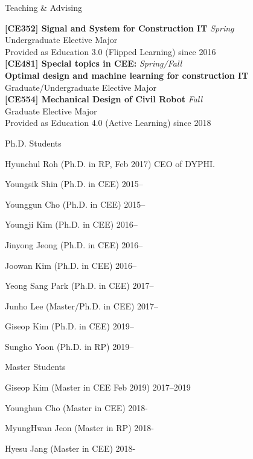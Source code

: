 \begin{rSection}{Teaching \& Advising}

{\bf[CE352] Signal and System for Construction IT} \hfill {\em Spring} \\
Undergraduate Elective Major \\
Provided as Education 3.0 (Flipped Learning) since 2016\\

{\bf[CE481] Special topics in CEE:} \hfill {\em Spring/Fall} \\
{\bf Optimal design and machine learning for construction IT}\\
Graduate/Undergraduate Elective Major \\

{\bf[CE554] Mechanical Design of Civil Robot } \hfill {\em Fall} \\
Graduate Elective Major \\
Provided as Education 4.0 (Active Learning) since 2018\\

\begin{rSubsection}{Ph.D. Students}{}{}{}
  \item Hyunchul Roh (Ph.D. in \acf{RP}, Feb 2017) \hfill CEO of DYPHI.
  \item Youngsik Shin (Ph.D. in \acf{CEE}) \hfill 2015--
  \item Younggun Cho (Ph.D. in \ac{CEE}) \hfill 2015--
  \item Youngji Kim (Ph.D. in \ac{CEE}) \hfill 2016--
  \item Jinyong Jeong (Ph.D. in \ac{CEE}) \hfill 2016--
  \item Joowan Kim (Ph.D. in \ac{CEE}) \hfill 2016--
  \item Yeong Sang Park (Ph.D. in \ac{CEE}) \hfill 2017--
  \item Junho Lee (Master/Ph.D. in \ac{CEE}) \hfill 2017--
  \item Giseop Kim (Ph.D. in \ac{CEE}) \hfill 2019--
  \item Sungho Yoon (Ph.D. in \ac{RP}) \hfill 2019--
\end{rSubsection}

\begin{rSubsection}{Master Students}{}{}{}
  \item Giseop Kim (Master in \ac{CEE} Feb 2019) \hfill 2017--2019
  \item Younghun Cho (Master in \ac{CEE}) \hfill 2018-
  \item MyungHwan Jeon (Master in \ac{RP}) \hfill 2018-
  \item Hyesu Jang (Master in \ac{CEE}) \hfill 2018-
\end{rSubsection}


\end{rSection}
